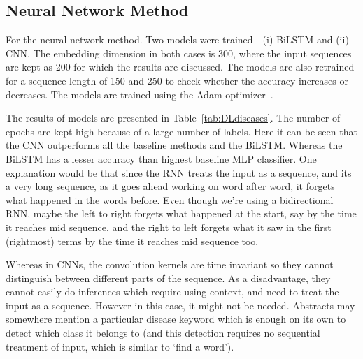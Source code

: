 \subsection{Neural Network Method}
For the neural network method. Two models were trained - (i) BiLSTM and (ii) CNN. The embedding dimension in both cases is 300, where the input sequences are kept as 200 for which the results are discussed. The models are also retrained for a sequence length of 150 and 250 to check whether the accuracy increases or decreases. The models are trained using the Adam optimizer~\cite{kingma2014adam}. 

The results of models are presented in Table~\ref{tab:DLdiseases}. The number of epochs are kept high because of a large number of labels. Here it can be seen that the CNN outperforms all the baseline methods and the BiLSTM. Whereas the BiLSTM has a lesser accuracy than highest baseline MLP classifier. One explanation would be that since the RNN treats the input as a sequence, and its a very long sequence, as it goes ahead working on word after word, it forgets what happened in the words before. Even though we're using a bidirectional RNN, maybe the left to right forgets what happened at the start, say by the time it reaches mid sequence, and the right to left forgets what it saw in the first (rightmost) terms by the time it reaches mid sequence too. 

Whereas in CNNs, the convolution kernels are time invariant so they cannot distinguish between different parts of the sequence. As a disadvantage, they cannot easily do inferences which require using context, and need to treat the input as a sequence. However in this case, it might not be needed. Abstracts may somewhere mention a particular disease keyword  which is enough on its own to detect which class it belongs to (and this detection requires no sequential treatment of input, which is similar to `find a word').

